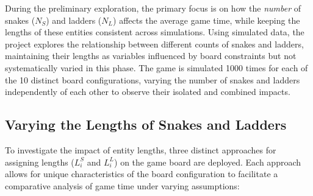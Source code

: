 During the preliminary exploration,  the primary focus is on how the \textit{number} of snakes ($N_S$) and ladders ($N_L$) affects the average game time, while keeping the lengths of these entities consistent across simulations. Using simulated data, the project explores the relationship between different counts of snakes and ladders, maintaining their lengths as variables influenced by board constraints but not systematically varied in this phase. The game is simulated 1000 times for each of the 10 distinct board configurations, varying the number of snakes and ladders independently of each other to observe their isolated and combined impacts.

\subsection{Varying the Lengths of Snakes and Ladders}

To investigate the impact of entity lengths, three distinct approaches for assigning lengths ($L^S_i$ and $L^L_i$) on the game board are deployed. Each approach allows for unique characteristics of the board configuration to facilitate a comparative analysis of game time under varying assumptions:

